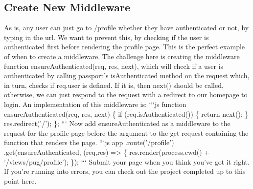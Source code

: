 \documentclass{article}%
\begin{document}
%
\subsection{Create New Middleware}%
\label{subsec:CreateNewMiddleware}%
As is, any user can just go to /profile whether they have authenticated or not, by typing in the url. We want to prevent this, by checking if the user is authenticated first before rendering the profile page. This is the perfect example of when to create a middleware.\newline%
The challenge here is creating the middleware function ensureAuthenticated(req, res, next), which will check if a user is authenticated by calling passport's isAuthenticated method on the request which, in turn, checks if req.user is defined. If it is, then next() should be called, otherwise, we can just respond to the request with a redirect to our homepage to login. An implementation of this middleware is:\newline%
```js\newline%
function ensureAuthenticated(req, res, next) \{\newline%
  if (req.isAuthenticated()) \{\newline%
    return next();\newline%
  \}\newline%
  res.redirect('/');\newline%
\};\newline%
```\newline%
Now add ensureAuthenticated as a middleware to the request for the profile page before the argument to the get request containing the function that renders the page.\newline%
```js\newline%
app\newline%
 .route('/profile')\newline%
 .get(ensureAuthenticated, (req,res) => \{\newline%
    res.render(process.cwd() + '/views/pug/profile');\newline%
 \});\newline%
```\newline%
Submit your page when you think you've got it right. If you're running into errors, you can check out the project completed up to this point here.\newline%

%
\end{document}
